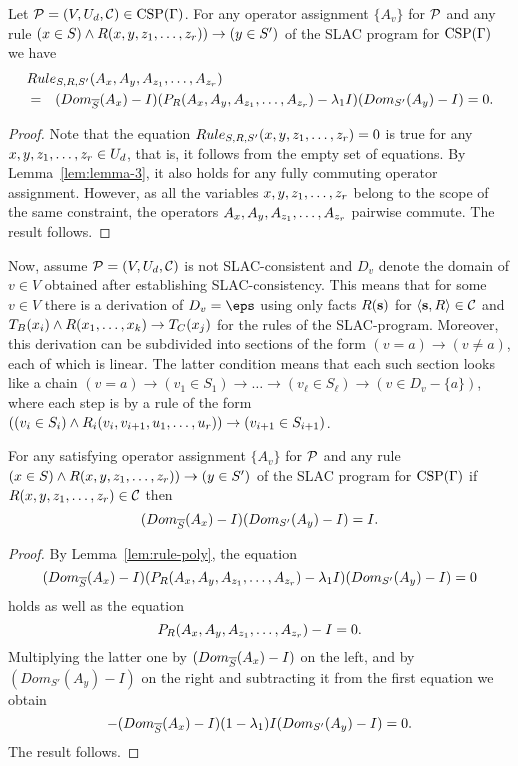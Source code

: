 \begin{lemma}\label{lem:rule-poly}
Let ${\mathcal P}=(V,U_d,{\mathcal C})\in{\rm CSP}(\Gamma)$. For any operator assignment $\{A_v\}$
for ${\mathcal P}$ and any rule $(x\in S)\wedge R(x,y,z _1,\ldots, z _{r}))\to (y\in S')$ of the SLAC program for ${\rm CSP}(\Gamma)$ we have
\begin{eqnarray*}
\lefteqn{Rule_{S,\rel,S'}(A_x,A_y,A_{z_1}\zd A_{z_r}) }\\
&=& (Dom_{\ov S}(A_x)-I)
(P_\rel(A_x,A_y,A_{z_1}\zd A_{z_r})-\ld_1I)(Dom_{S'}(A_y)-I)=0.
\end{eqnarray*}
\end{lemma}
%
\begin{proof}
Note that the equation $Rule_{S,R,S'}(x,y,z _1,\ldots, z _{r})=0$ is true for any
$x,y,z _1,\ldots, z _{r}\in U_d$, that is, it follows from the empty set of equations. By
Lemma~\ref{lem:lemma-3}, it also holds for any fully commuting operator 
assignment. However, as all the variables $x,y,z _1,\ldots, z _{r}$ belong to the scope
of the same constraint, the operators $A_x,A_y,A_{z_1},\ldots, A_{z_r}$ 
pairwise commute.  The result follows.
\end{proof}

Now, assume ${\mathcal P}=(V,U_d,{\mathcal C})$ is not SLAC-consistent and $D_v$ denote the domain of $v\in V$ obtained after establishing SLAC-consistency. This means that for 
some $v\in V$ there is a derivation of $D_v=\eps$ using only facts
$R({\bf s})$ for $\langle {\bf s},R \rangle\in{\mathcal C}$ and 
$T_B(x_i)\wedge R(x _1,\ldots, x _{k})\to T_C(x_j)$ for the rules of the SLAC-program. Moreover, this derivation can be subdivided into sections
of the form $(v=a)\to(v\ne a)$, each of which is linear. The latter 
condition means that each such section looks like a chain
$(v=a)\to(v_1\in S_1)\to\dots\to(v_\ell\in S_\ell)\to(v\in D_v-\{a\})$,
where each step is by a rule of the form 
$((v_i\in S_i)\wedge R_i(v_i,v_{i+1},u _1,\ldots, u _{r}))\to(v_{i+1}\in S_{i+1})$.

\begin{lemma}\label{lem:derivation-poly}
For any satisfying operator assignment $\{A_v\}$ for ${\mathcal P}$ and any rule $(x\in S)\wedge R(x,y,z _1,\ldots, z _{r}))\to (y\in S')$ of the SLAC program for ${\rm CSP}(\Gamma)$ if 
$R(x,y,z _1,\ldots, z _{r})\in{\mathcal C}$ then 
\[
(Dom_{\overline S}(A_x)-I)(Dom_{S'}(A_y)-I)=I.
\]
\end{lemma}
%
\begin{proof}
By Lemma~\ref{lem:rule-poly}, the equation 
\[
(Dom_{\overline S}(A_x)-I)(P_R(A_x,A_y,A_{z_1},\ldots, A_{z_r})-\lambda_1I)
(Dom_{S'}(A_y)-I)=0
\]
holds as well as the equation 
\[
P_R(A_x,A_y,A_{z_1},\ldots, A_{z_r})-I=0.
\]
Multiplying the latter one by $(Dom_{\overline S}(A_x)-I)$ on the left, and 
by $(Dom_{S'}(A_y)-I)$ on the right and subtracting it from the first equation
we obtain
\[
-(Dom_{\overline S}(A_x)-I)(1-\lambda_1)I(Dom_{S'}(A_y)-I)=0.
\]
The result follows.
\end{proof}

